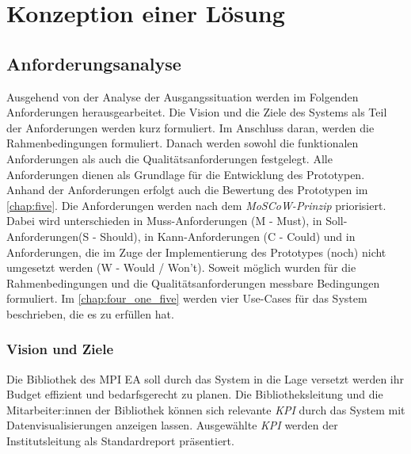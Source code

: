 \chapter{Konzeption einer Lösung}
\label{chap:four}

\section{Anforderungsanalyse}
Ausgehend von der Analyse der Ausgangssituation werden im Folgenden 
Anforderungen herausgearbeitet. Die Vision und die Ziele des Systems als Teil der Anforderungen werden kurz formuliert. Im Anschluss daran,
werden die Rahmenbedingungen formuliert. Danach werden sowohl die funktionalen Anforderungen als
auch die Qualitätsanforderungen festgelegt. Alle Anforderungen dienen als Grundlage für die Entwicklung des Prototypen. 
Anhand der Anforderungen erfolgt auch die Bewertung des Prototypen im \autoref{chap:five}. 
Die Anforderungen werden nach dem \textit{MoSCoW-Prinzip} priorisiert. 
Dabei wird unterschieden in Muss-Anforderungen (M - Must), in Soll-Anforderungen(S - Should), in Kann-Anforderungen (C - Could) und in Anforderungen,
die im Zuge der Implementierung des Prototypes (noch) nicht umgesetzt werden (W - Would / Won't).
Soweit möglich wurden für die Rahmenbedingungen und die Qualitätsanforderungen messbare Bedingungen formuliert. Im \autoref{chap:four_one_five} werden
vier Use-Cases für das System beschrieben, die es zu erfüllen hat.

\subsection{Vision und Ziele}
Die Bibliothek des \acrshort{MPI EA} soll durch das System in die Lage versetzt werden ihr Budget effizient und bedarfsgerecht zu planen.
Die Bibliotheksleitung und die Mitarbeiter:innen der Bibliothek können sich relevante \textit{\acrshort{KPI}} durch das System mit
Datenvisualisierungen anzeigen lassen.
Ausgewählte \textit{\acrshort{KPI}} werden der Institutsleitung als Standardreport präsentiert.

